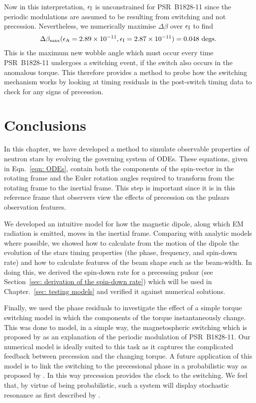 \documentclass[../full_thesis/full_thesis.tex]{subfiles}
\begin{document}
Now in this interpretation, $\epsilon_{\mathrm{I}}$ is unconstrained for PSR~B1828-11 since the
periodic modulations are assumed to be resulting from switching and not
precession. Nevertheless, we numerically maximise $\Delta\beta$ over $\epsilon_{\mathrm{I}}$ to
find
\begin{align}
\Delta\beta_{\textrm{max}}(\epsilon_{\mathrm{A}}=2.89\times10^{-11}, \epsilon_{\mathrm{I}}=2.87\times10^{-11})
= 0.048 \textrm{ degs}.
\end{align}
This is the maximum new wobble angle which must occur every time PSR~B1828-11 undergoes a
switching event, if the switch also occurs in the anomalous torque. This
therefore provides a method to probe how the switching mechanism works by
looking at timing residuals in the post-switch timing data to check for
any signs of precession.

\section{Conclusions}
\label{sec: conclusion inertial}

In this chapter, we have developed a method to simulate observable properties
of neutron stars by evolving the governing system of ODEs. These equations,
given in Eqn.~\eqref{eqn: ODEs}, contain both the components of the spin-vector
in the rotating frame and the Euler rotation angles required to transform from
the rotating frame to the inertial frame. This step is important since it is in
this reference frame that observers view the effects of precession on the
pulsars observation features.

We developed an intuitive model for how the magnetic dipole, along which EM
radiation is emitted, moves in the inertial frame. Comparing with analytic
models where possible, we showed how to calculate from the motion of the
dipole the evolution of the stars timing properties (the phase, frequency, and
spin-down rate) and how to calculate features of the beam shape such as the
beam-width. In doing this, we derived the spin-down rate for a precessing pulsar
(see Section~\ref{sec: derivation of the spin-down rate}) which will be used in
Chapter.~\ref{sec: testing models} and verified it against numerical solutions.

Finally, we used the phase residuals to investigate the effect of a simple torque
switching model in which the components of the torque instantaneously change.
This was done to model, in a simple way, the magnetospheric switching which is
proposed by \citet{Lyne2010} as an explanation of the periodic modulation of
PSR~B1828-11. Our numerical model is ideally suited to this task as it captures the
complicated feedback between precession and the changing torque.
A future application of this model is to link the switching to the precessional
phase in a probabilistic way as proposed by \citet{Jones2012}. In this way
precession provides the clock to the switching. We feel that, by virtue of
being probabilistic, such a system will display stochastic resonance as first
described by \citet{Cordes2013}.

\biblio
\end{document}
